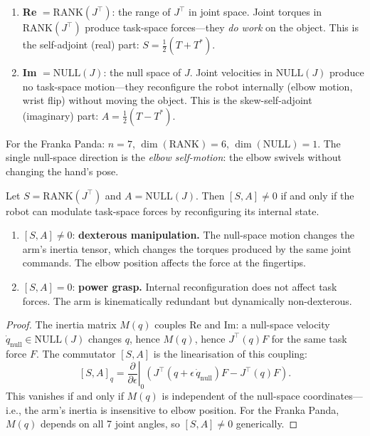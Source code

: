 \begin{definition}\label{def:m-reim}
\leavevmode
\begin{enumerate}[label=(\roman*),nosep]
  \item \textbf{Re} $= \mathrm{RANK}(J^\top)$: the range of $J^\top$
  in joint space.  Joint torques in $\mathrm{RANK}(J^\top)$ produce
  task-space forces---they \emph{do work} on the object.  This is
  the self-adjoint (real) part: $S = \tfrac{1}{2}(T + T^*)$.
  \item \textbf{Im} $= \mathrm{NULL}(J)$: the null space of $J$.
  Joint velocities in $\mathrm{NULL}(J)$ produce no task-space
  motion---they reconfigure the robot internally (elbow motion,
  wrist flip) without moving the object.  This is the
  skew-self-adjoint (imaginary) part: $A = \tfrac{1}{2}(T - T^*)$.
\end{enumerate}
\end{definition}

For the Franka Panda: $n = 7$, $\dim(\mathrm{RANK}) = 6$,
$\dim(\mathrm{NULL}) = 1$.  The single null-space direction is the
\emph{elbow self-motion}: the elbow swivels without changing the
hand's pose.

\begin{theorem}\label{thm:m-commutator}
Let $S = \mathrm{RANK}(J^\top)$ and $A = \mathrm{NULL}(J)$.
Then $[S, A] \neq 0$ if and only if the robot can modulate
task-space forces by reconfiguring its internal state.
\begin{enumerate}[label=(\roman*),nosep]
  \item $[S, A] \neq 0$: \textbf{dexterous manipulation.}  The
  null-space motion changes the arm's inertia tensor, which
  changes the torques produced by the same joint commands.
  The elbow position affects the force at the fingertips.
  \item $[S, A] = 0$: \textbf{power grasp.}  Internal
  reconfiguration does not affect task forces.  The arm is
  kinematically redundant but dynamically non-dexterous.
\end{enumerate}
\end{theorem}

\begin{proof}
The inertia matrix $M(q)$ couples Re and Im: a null-space velocity
$\dot{q}_\mathrm{null} \in \mathrm{NULL}(J)$ changes $q$, hence
$M(q)$, hence $J^\top(q) F$ for the same task force $F$.  The
commutator $[S, A]$ is the linearisation of this coupling:
\[
  [S, A]_q = \left.\frac{\partial}{\partial \epsilon}\right|_0
  \left( J^\top(q + \epsilon\,\dot{q}_\mathrm{null}) F
  - J^\top(q) F \right).
\]
This vanishes if and only if $M(q)$ is independent of the
null-space coordinates---i.e., the arm's inertia is insensitive
to elbow position.  For the Franka Panda, $M(q)$ depends on all
7 joint angles, so $[S, A] \neq 0$ generically.
\end{proof}

